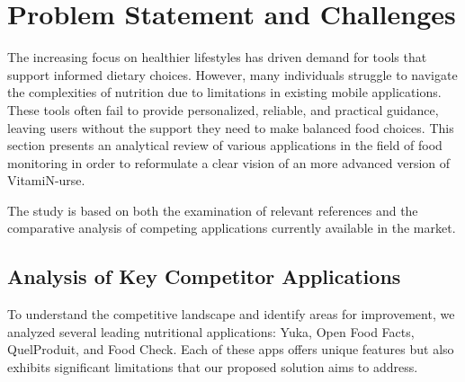 \section{Problem Statement and Challenges}

The increasing focus on healthier lifestyles has driven demand for tools that support informed dietary choices. However, many individuals struggle to navigate the complexities of nutrition due to limitations in existing mobile applications. These tools often fail to provide personalized, reliable, and practical guidance, leaving users without the support they need to make balanced food choices. This section presents an analytical review of various applications in the field of food monitoring in order to reformulate a clear vision of an more advanced version of \mbox{VitamiN-urse}. 

\par The study is based on both the examination of relevant references and the comparative analysis of competing applications currently available in the market.

\subsection{Analysis of Key Competitor Applications}
To understand the competitive landscape and identify areas for improvement, we analyzed several leading nutritional applications: Yuka, Open
Food Facts, QuelProduit, and Food Check. Each of these apps offers
unique features but also exhibits significant limitations that our proposed
solution aims to address.

